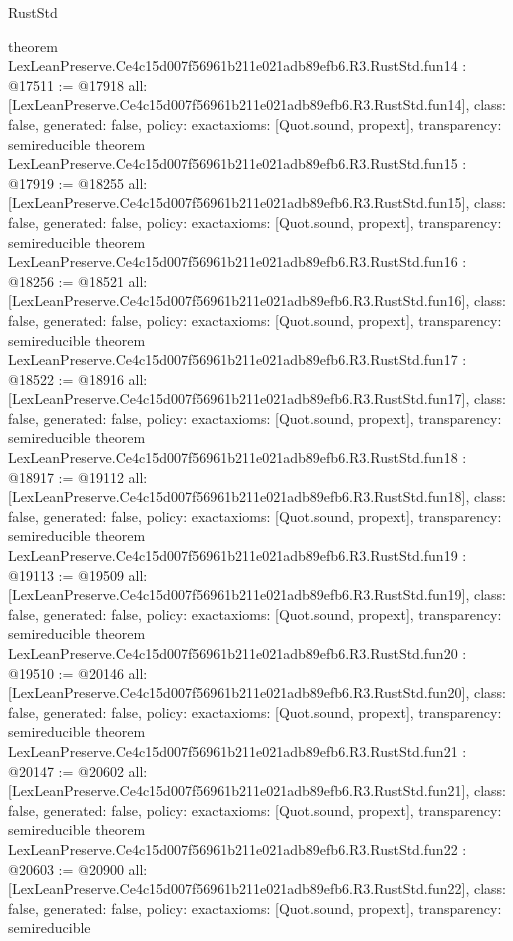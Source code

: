 \begin{lexlean}{RustStd}
\begin{coremodule}
{}
theorem LexLeanPreserve.Ce4c15d007f56961b211e021adb89efb6.R3.RustStd.fun14 : @17511 := @17918 {
  all: [LexLeanPreserve.Ce4c15d007f56961b211e021adb89efb6.R3.RustStd.fun14],
  class: false,
  generated: false,
  policy: exact{axioms: [Quot.sound, propext]},
  transparency: semireducible
}
theorem LexLeanPreserve.Ce4c15d007f56961b211e021adb89efb6.R3.RustStd.fun15 : @17919 := @18255 {
  all: [LexLeanPreserve.Ce4c15d007f56961b211e021adb89efb6.R3.RustStd.fun15],
  class: false,
  generated: false,
  policy: exact{axioms: [Quot.sound, propext]},
  transparency: semireducible
}
theorem LexLeanPreserve.Ce4c15d007f56961b211e021adb89efb6.R3.RustStd.fun16 : @18256 := @18521 {
  all: [LexLeanPreserve.Ce4c15d007f56961b211e021adb89efb6.R3.RustStd.fun16],
  class: false,
  generated: false,
  policy: exact{axioms: [Quot.sound, propext]},
  transparency: semireducible
}
theorem LexLeanPreserve.Ce4c15d007f56961b211e021adb89efb6.R3.RustStd.fun17 : @18522 := @18916 {
  all: [LexLeanPreserve.Ce4c15d007f56961b211e021adb89efb6.R3.RustStd.fun17],
  class: false,
  generated: false,
  policy: exact{axioms: [Quot.sound, propext]},
  transparency: semireducible
}
theorem LexLeanPreserve.Ce4c15d007f56961b211e021adb89efb6.R3.RustStd.fun18 : @18917 := @19112 {
  all: [LexLeanPreserve.Ce4c15d007f56961b211e021adb89efb6.R3.RustStd.fun18],
  class: false,
  generated: false,
  policy: exact{axioms: [Quot.sound, propext]},
  transparency: semireducible
}
theorem LexLeanPreserve.Ce4c15d007f56961b211e021adb89efb6.R3.RustStd.fun19 : @19113 := @19509 {
  all: [LexLeanPreserve.Ce4c15d007f56961b211e021adb89efb6.R3.RustStd.fun19],
  class: false,
  generated: false,
  policy: exact{axioms: [Quot.sound, propext]},
  transparency: semireducible
}
theorem LexLeanPreserve.Ce4c15d007f56961b211e021adb89efb6.R3.RustStd.fun20 : @19510 := @20146 {
  all: [LexLeanPreserve.Ce4c15d007f56961b211e021adb89efb6.R3.RustStd.fun20],
  class: false,
  generated: false,
  policy: exact{axioms: [Quot.sound, propext]},
  transparency: semireducible
}
theorem LexLeanPreserve.Ce4c15d007f56961b211e021adb89efb6.R3.RustStd.fun21 : @20147 := @20602 {
  all: [LexLeanPreserve.Ce4c15d007f56961b211e021adb89efb6.R3.RustStd.fun21],
  class: false,
  generated: false,
  policy: exact{axioms: [Quot.sound, propext]},
  transparency: semireducible
}
theorem LexLeanPreserve.Ce4c15d007f56961b211e021adb89efb6.R3.RustStd.fun22 : @20603 := @20900 {
  all: [LexLeanPreserve.Ce4c15d007f56961b211e021adb89efb6.R3.RustStd.fun22],
  class: false,
  generated: false,
  policy: exact{axioms: [Quot.sound, propext]},
  transparency: semireducible
}
\end{coremodule}
\end{lexlean}
